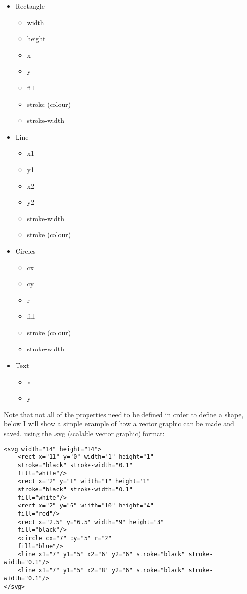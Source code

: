   \begin{itemize}
  	\item Rectangle
  	\begin{itemize}
  		\item width
  		\item height
  		\item x
  		\item y
  		\item fill
  		\item stroke (colour)
  		\item stroke-width
  	\end{itemize}
  	\item Line
  	\begin{itemize}
  		\item x1
  		\item y1
  		\item x2
  		\item y2
  		\item stroke-width
  		\item stroke (colour)
  	\end{itemize}
  	\item Circles
  	\begin{itemize}
  		\item cx
  		\item cy
  		\item r
  		\item fill
  		\item stroke (colour)
  		\item stroke-width
  	\end{itemize}
  	\item Text
  	\begin{itemize}
  		\item x
  		\item y
  	\end{itemize}
  \end{itemize}
  Note that not all of the properties need to be defined in order to define a shape, below I will show a simple example of how a vector graphic can be made and saved, using the .svg (scalable vector graphic) format:
  \begin{verbatim}
<svg width="14" height="14">
	<rect x="11" y="0" width="1" height="1"
	stroke="black" stroke-width="0.1"
	fill="white"/>
	<rect x="2" y="1" width="1" height="1"
	stroke="black" stroke-width="0.1"
	fill="white"/>
	<rect x="2" y="6" width="10" height="4"
	fill="red"/>
	<rect x="2.5" y="6.5" width="9" height="3"
	fill="black"/>
	<circle cx="7" cy="5" r="2"
	fill="blue"/>
	<line x1="7" y1="5" x2="6" y2="6" stroke="black" stroke-width="0.1"/>
	<line x1="7" y1="5" x2="8" y2="6" stroke="black" stroke-width="0.1"/>
</svg>\end{verbatim}
  \begin{figure}[H]
  	\centering
  	\def\svgwidth{12cm}
  	
  \end{figure}
  
